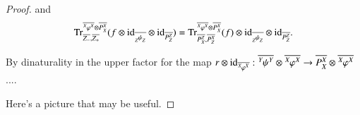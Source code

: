 \documentclass{amsart}
\def\blackbox#1#2#3#4#5{%
  \pgfgetlastxy{\llx}{\lly}%
  \path #1;
  \pgfgetlastxy{\w}{\h}
  \pgfmathsetlengthmacro{\urx}{\llx+\w}
  \pgfmathsetlengthmacro{\ury}{\lly+\h}
  \draw (\llx,\lly) rectangle (\urx,\ury);
  \pgfmathsetlengthmacro{\xave}{(\llx+\urx)/2}
  \pgfmathsetlengthmacro{\yave}{\ury-8}
  \node at (\xave,\yave) {#4};
  \pgfmathsetlengthmacro{\ydiff}{\ury-\lly}
  \pgfmathsetlengthmacro{\lstep}{\ydiff/(#2+1)}
  \pgfmathsetlengthmacro{\rstep}{\ydiff/(#3+1)}
  \ifnum #2=0{}\else{ 
   \foreach \l in {1,...,#2}{
    \draw [->] ($(\llx,\lly)+(-#5/2,0)+\l*(0,\lstep)$) -- ($(\llx,\lly)+(#5/2,0)+\l*(0,\lstep)$);}}\fi
  \ifnum #3=0{}\else{
   \foreach \r in {1,...,#3}{
    \draw [->] ($(\urx,\ury)+(-#5/2,0)-\r*(0,\rstep)$) -- ($(\urx,\ury)+(#5/2,0)-\r*(0,\rstep)$);}}\fi
}
\def\directarc#1#2{%
  \path #1;
  \pgfgetlastxy{\lx}{\ly}
  \path #2;
  \pgfgetlastxy{\rx}{\ry}
  \pgfmathsetlengthmacro{\xave}{(\lx+\rx)/2}
  \draw #1 .. controls (\xave,\ly) and (\xave,\ry) .. #2;
}
\def\loopright#1#2#3{%
  \path #1;
  \pgfgetlastxy{\ux}{\uy}
  \path #2;
  \pgfgetlastxy{\lx}{\ly}
  \pgfmathsetlengthmacro{\maxx}{max(\ux,\lx)}
  \pgfmathsetlengthmacro{\farx}{\maxx+#3}
  \draw #1 .. controls (\farx,\uy) and (\farx,\ly) .. #2;
}
\def\loopleft#1#2#3{%
  \path #1;
  \pgfgetlastxy{\ux}{\uy}
  \path #2;
  \pgfgetlastxy{\lx}{\ly}
  \pgfmathsetlengthmacro{\minx}{min(\ux,\lx)}
  \pgfmathsetlengthmacro{\farx}{\minx-#3}
  \draw #1 .. controls (\farx,\uy) and (\farx,\ly) .. #2;
}
\def\fancyarc#1#2#3#4{%
  \path #1;
  \pgfgetlastxy{\ux}{\uy}
  \path #2;
  \pgfgetlastxy{\lx}{\ly}
  \pgfmathsetlengthmacro{\xave}{(\lx+\ux)/2}
  \pgfmathsetlengthmacro{\yave}{(\ly+\uy)/2+#4}
  \loopleft{#1}{(\xave,\yave)}{#3}
  \loopright{#2}{(\xave,\yave)}{#3}
}
\def\inactivetikz#1{}
\def\tn{\textnormal}
\def\Trace{\tn{Tr}}
\def\hsp{\hspace{.3in}}
\def\to{\rightarrow}
\def\ol{\overline}
\def\id{\tn{id}}
\newcommand{\inp}[1]{{#1_-}}
\newcommand{\outp}[1]{{#1_+}}
\newcommand{\feeddd}[3]{{\tensor*[^{#2}_{\color{white}{!}}]{{#1}}{^{#3}}}}%
\newcommand{\feeddc}[3]{{\tensor*[^{#2}]{{#1}}{_{#3}}}}
\newcommand{\feedcd}[3]{{\tensor*[_{#2}]{{#1}}{^{#3}}}}
\newcommand{\feedcc}[3]{{\tensor*[^{\color{white}{!}}_{#2}]{{#1}}{_{#3}}}}
\theoremstyle{remark}
\theoremstyle{definition}
\begin{document}
\begin{proof}
and
\[\Trace^{\ol{\feeddd{\varphi}{X}{X}}\otimes\ol{P_X^X}}_{\ol{\inp{Z}},\ol{\outp{Z}}}(f\otimes\id_{\ol{\feedcc{\psi}{Z}{Z}}}\otimes\id_{\ol{P_Z^Z}})=\Trace^{\ol{\feeddd{\varphi}{X}{X}}\otimes\ol{P_X^X}}_{\ol{P_X^Z},\ol{P_Z^X}}(f)\otimes\id_{\ol{\feedcc{\psi}{Z}{Z}}}\otimes\id_{\ol{P_Z^Z}}.\]

By dinaturality in the upper factor for the map $r\otimes\id_{\ol{\feeddd{\varphi}{X}{X}}}:\ol{\feeddd{\psi}{Y}{Y}}\otimes\ol{\feeddd{\varphi}{X}{X}}\to\ol{P_X^X}\otimes\ol{\feeddd{\varphi}{X}{X}}$....

\bigskip

Here's a picture that may be useful.
\inactivetikz{
	\path(0,0);\blackbox{(10,8)}{3}{3}{$Z$}{.8}
	\path(2.5,1.5);\blackbox{(5,5)}{4}{4}{$Y$}{.6}
	\path(4,3);\blackbox{(2,2)}{3}{3}{$X$}{.4}
	\fancyarc{(.4,6)}{(9.6,6)}{-30}{30}\node at (5,7.1){\tiny$\feedcc{\psi}{Z}{Z}$};
	\directarc{(.4,4)}{(2.2,5.5)}\node at (1.5,5.1){\tiny$\feedcd{\psi}{Z}{Y}$};
	\directarc{(.4,2)}{(2.2,4.5)}\node at (1.5,4.1){\tiny$\feedcd{\psi}{Z}{Y}$};
	\directarc{(7.8,5.5)}{(9.6,4)}\node at (8.5,5.1){\tiny$\feeddc{\psi}{Y}{Z}$};
	\directarc{(7.8,4.5)}{(9.6,2)}\node at (8.5,4.1){\tiny$\feeddc{\psi}{Y}{Z}$};
	\fancyarc{(2.2,3.5)}{(7.8,3.5)}{40}{-90}\node at (5,.8){\tiny$\feeddd{\psi}{Y}{Y}$};
	\fancyarc{(2.2,2.5)}{(7.8,2.5)}{20}{-50}\node at (5,.4){\tiny$\feeddd{\psi}{Y}{Y}$};
	\draw(5,1.1) circle(5pt);\node at (5.2,1.1){\tiny$\psi_{loop}$};
	\directarc{(2.8,5.5)}{(7.2,5.5)}\node at (5,5.5){\tiny$\feedcc{\varphi}{Y}{Y}$};
	\directarc{(2.8,2.5)}{(7.2,2.5)}\node at (5,2.5){\tiny$\feedcc{\varphi}{Y}{Y}$};
	\directarc{(2.8,4.5)}{(3.8,4.5)}\node at (3.5,4.5){\tiny$\feedcd{\varphi}{Y}{X}$};
	\directarc{(2.8,3.5)}{(3.8,4)}\node at (3.5,3.8){\tiny$\feedcd{\varphi}{Y}{X}$};
	\directarc{(6.2,4.5)}{(7.2,4.5)}\node at (6.5,4.5){\tiny$\feeddc{\varphi}{X}{Y}$};
	\directarc{(6.2,4)}{(7.2,3.5)}\node at (6.5,3.8){\tiny$\feeddc{\varphi}{X}{Y}$};
	\fancyarc{(3.8,3.5)}{(6.2,3.5)}{10}{-23}\node at (5,2.7){\tiny$\feeddd{\varphi}{X}{X}$};
	\draw(5,2) circle(5pt);\node at (5.2,2){\tiny$\phi_{loop}$};
}

\inactivetikz{
	\path(0,0);\blackbox{(10,8)}{3}{3}{$Z$}{.8}
	\path(4,1.5);\blackbox{(2,2)}{3}{3}{$X$}{.4}
	\directarc{(.4,6)}{(9.6,6)}
	\directarc{(.4,4)}{(9.6,4)}
	\directarc{(.4,2)}{(3.8,3)}
	\directarc{(6.2,3)}{(9.6,2)}
	\fancyarc{(3.8,2.5)}{(6.2,2.5)}{20}{-60}
	\fancyarc{(3.8,2)}{(6.2,2)}{10}{-30}
	\draw(2,1) circle(5pt);
	\draw(2.5,1.2) circle(5pt);
	\draw(3,.7) circle(5pt);
}

\end{proof}
\end{document}
